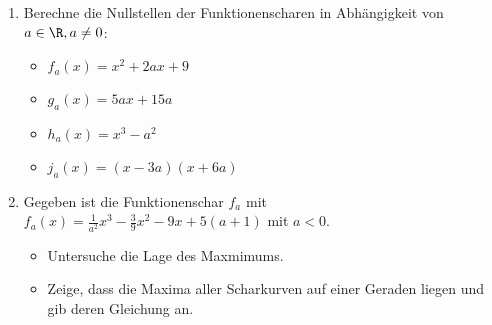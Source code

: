\begin{enumerate}
  \item Berechne die Nullstellen der Funktionenscharen in Abhängigkeit von $a\in \R, a\neq 0$:
  \begin{itemize}
    \item $f_a(x)=x^2+2ax+9$
    \item $g_a(x)=5ax+15a$
    \item $h_a(x)=x^3-a^2$
    \item $j_a(x)=(x-3a)(x+6a)$
  \end{itemize}
  \item Gegeben ist die Funktionenschar $f_a$ mit $f_a(x)=\frac{1}{a^2}x^3-\frac{3}{9}x^2-9x+5(a+1)$ mit $a<0$.
  \begin{itemize}
    \item Untersuche die Lage des Maxmimums.
    \item Zeige, dass die Maxima aller Scharkurven auf einer Geraden liegen und gib deren Gleichung an.
  \end{itemize}
\end{enumerate}

